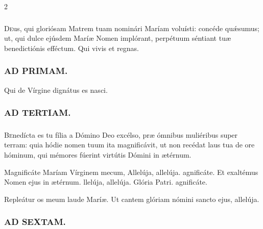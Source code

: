 \documentclass[9pt,twoside]{extarticle}
\begin{document}
\begin{multicols}{2}
\subsubsection*{\center {}}
\lettrine{D}eus, qui gloriósam Matrem tuam nominári Maríam voluísti: concéde quǽsumus; ut, qui dulce ejúsdem Maríæ Nomen implórant, perpétuum séntiant tuæ benedictiónis efféctum. Qui vivis et regnas.

\subsubsection*{\center \textsc{AD PRIMAM.}}
\begin{tightlist}{}
\item {}
\item {} Qui de Vírgine dignátus es nasci.
\end{tightlist}

\subsubsection*{\center \textsc{AD TERTIAM.}}
\subsubsection*{}
\lettrine{B}enedícta es tu fília a Dómino Deo excélso, præ ómnibus muliéribus super terram: quia hódie nomen tuum ita magnificávit, ut non recédat laus tua de ore hóminum, qui mémores fúerint virtútis Dómini in ætérnum.

\begin{tightlist}{}
\item {} Magnificáte Maríam Vírginem mecum, \textred{*} Allelúja, allelúja. agnificáte.  Et exaltémus Nomen ejus in ætérnum. llelúja, allelúja. Glória Patri. agnificáte.
\item {} Repleátur os meum laude Maríæ.  Ut cantem glóriam nómini sancto ejus, allelúja.
\end{tightlist}

\subsubsection*{\center \textsc{AD SEXTAM.}}

\end{multicols}
\end{document}
